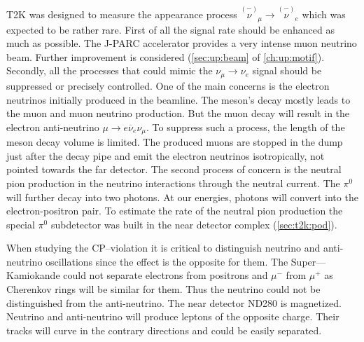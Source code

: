 \documentclass[../main.tex]{subfiles}
\begin{document}
T2K was designed to measure the appearance process $\overset{\scriptscriptstyle(-)}{\nu}_\mu\to\overset{\scriptscriptstyle(-)}{\nu}_e$ which was expected to be rather rare. First of all the signal rate should be enhanced as much as possible. The J-PARC accelerator provides a very intense muon neutrino beam. Further improvement is considered (\autoref{sec:up:beam} of \autoref{ch:up:motif}). Secondly, all the processes that could mimic the $\nu_\mu\to\nu_e$ signal should be suppressed or precisely controlled. One of the main concerns is the electron neutrinos initially produced in the beamline. The meson's decay mostly leads to the muon and muon neutrino production. But the muon decay will result in the electron anti-neutrino $\mu\to e\overline{\nu}_e\nu_\mu$. To suppress such a process, the length of the meson decay volume is limited. The produced muons are stopped in the dump just after the decay pipe and emit the electron neutrinos isotropically, not pointed towards the far detector. The second process of concern is the neutral pion production in the neutrino interactions through the neutral current. The $\pi^0$ will further decay into two photons. At our energies, photons will convert into the electron-positron pair.  To estimate the rate of the neutral pion production the special $\pi^0$ subdetector was built in the near detector complex (\autoref{sec:t2k:pod}).

When studying the CP--violation it is critical to distinguish neutrino and anti-neutrino oscillations since the effect is the opposite for them. The Super---Kamiokande could not separate electrons from positrons and $\mu^-$ from $\mu^+$ as Cherenkov rings will be similar for them. Thus the neutrino could not be distinguished from the anti-neutrino. The near detector ND280 is magnetized. Neutrino and anti-neutrino will produce leptons of the opposite charge. Their tracks will curve in the contrary directions and could be easily separated. 
\end{document}
